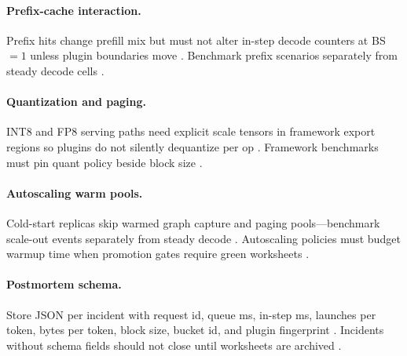 \paragraph{Prefix-cache interaction.} Prefix hits change prefill mix but must not alter in-step decode counters at BS${=}1$ unless plugin boundaries move \citep{kwon2023vllm,patel2025llminference,yirage2026,chen2020compilerbasedhardw,memoryfloor2026,taxbreak2026,liu2024deepseekv3,nvidia2024cudagraphs,dao2022flashattention,amd2024aie,amd2024xdna,dlbook,dao2023flashdecoding,nvidia2022hopper,semianalysis2024tma}. Benchmark prefix scenarios separately from steady decode cells \citep{patel2025llminference,kwon2023vllm,taxbreak2026,memoryfloor2026,yirage2026,chen2020compilerbasedhardw,dlbook}.

\paragraph{Quantization and paging.} INT8 and FP8 serving paths need explicit scale tensors in framework export regions so plugins do not silently dequantize per op \citep{liu2024deepseekv3,yirage2026,chen2020compilerbasedhardw,patel2025llminference,memoryfloor2026,taxbreak2026,kwon2023vllm,nvidia2024cudagraphs,dao2022flashattention,amd2024aie,amd2024xdna,dlbook,dao2023flashdecoding,nvidia2022hopper,semianalysis2024tma}. Framework benchmarks must pin quant policy beside block size \citep{liu2024deepseekv3,kwon2023vllm,patel2025llminference,yirage2026,chen2020compilerbasedhardw,memoryfloor2026,taxbreak2026,dlbook}.

\paragraph{Autoscaling warm pools.} Cold-start replicas skip warmed graph capture and paging pools---benchmark scale-out events separately from steady decode \citep{nvidia2024cudagraphs,kwon2023vllm,patel2025llminference,memoryfloor2026,yirage2026,chen2020compilerbasedhardw,taxbreak2026,liu2024deepseekv3,dao2022flashattention,amd2024aie,amd2024xdna,dlbook,dao2023flashdecoding,nvidia2022hopper,semianalysis2024tma}. Autoscaling policies must budget warmup time when promotion gates require green worksheets \citep{memoryfloor2026,nvidia2024cudagraphs,patel2025llminference,yirage2026,chen2020compilerbasedhardw,kwon2023vllm,taxbreak2026,dlbook}.

\paragraph{Postmortem schema.} Store JSON per incident with request id, queue ms, in-step ms, launches per token, bytes per token, block size, bucket id, and plugin fingerprint \citep{yirage2026,chen2020compilerbasedhardw,patel2025llminference,kwon2023vllm,taxbreak2026,memoryfloor2026,liu2024deepseekv3,nvidia2024cudagraphs,dao2022flashattention,amd2024aie,amd2024xdna,dlbook,dao2023flashdecoding,nvidia2022hopper,semianalysis2024tma}. Incidents without schema fields should not close until worksheets are archived \citep{patel2025llminference,yirage2026,chen2020compilerbasedhardw,kwon2023vllm,dlbook}.

